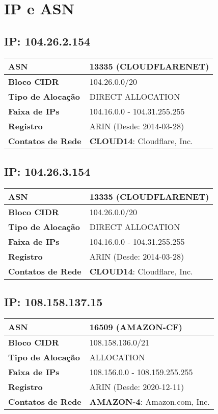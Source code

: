 \section{IP e ASN}

    \subsection{IP: 104.26.2.154}
    \begin{tabular}{|l|l|}
    \hline
    \textbf{ASN} & 13335 (CLOUDFLARENET) \\ \hline
    \textbf{Bloco CIDR} & 104.26.0.0/20 \\ \hline
    \textbf{Tipo de Alocação} & DIRECT ALLOCATION \\ \hline
    \textbf{Faixa de IPs} & 104.16.0.0 - 104.31.255.255 \\ \hline
    \textbf{Registro} & ARIN (Desde: 2014-03-28) \\ \hline
        
\textbf{Contatos de Rede} & \textbf{CLOUD14}: Cloudflare, Inc. 
\\ \hline
\end{tabular}


    \subsection{IP: 104.26.3.154}
    \begin{tabular}{|l|l|}
    \hline
    \textbf{ASN} & 13335 (CLOUDFLARENET) \\ \hline
    \textbf{Bloco CIDR} & 104.26.0.0/20 \\ \hline
    \textbf{Tipo de Alocação} & DIRECT ALLOCATION \\ \hline
    \textbf{Faixa de IPs} & 104.16.0.0 - 104.31.255.255 \\ \hline
    \textbf{Registro} & ARIN (Desde: 2014-03-28) \\ \hline
        
\textbf{Contatos de Rede} & \textbf{CLOUD14}: Cloudflare, Inc. 
\\ \hline
\end{tabular}


    \subsection{IP: 108.158.137.15}
    \begin{tabular}{|l|l|}
    \hline
    \textbf{ASN} & 16509 (AMAZON-CF) \\ \hline
    \textbf{Bloco CIDR} & 108.158.136.0/21 \\ \hline
    \textbf{Tipo de Alocação} & ALLOCATION \\ \hline
    \textbf{Faixa de IPs} & 108.156.0.0 - 108.159.255.255 \\ \hline
    \textbf{Registro} & ARIN (Desde: 2020-12-11) \\ \hline
        
\textbf{Contatos de Rede} & \textbf{AMAZON-4}: Amazon.com, Inc. 
\\ \hline
\end{tabular}


